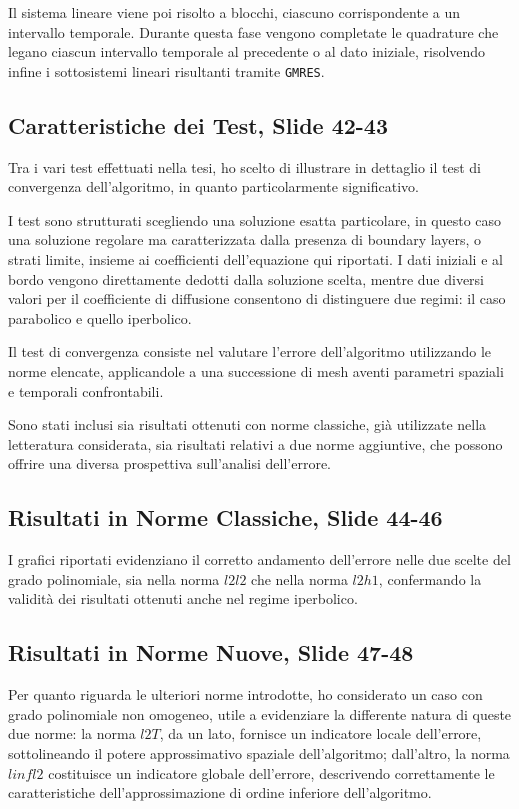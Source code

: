 \documentclass[12pt]{article}
\begin{document}
    Il sistema lineare viene poi risolto a blocchi, ciascuno corrispondente a un intervallo temporale. Durante questa fase vengono completate le quadrature che legano ciascun intervallo temporale al precedente o al dato iniziale, risolvendo infine i sottosistemi lineari risultanti tramite \lstinline{GMRES}.

    \subsection{Caratteristiche dei Test, Slide 42-43}

    Tra i vari test effettuati nella tesi, ho scelto di illustrare in dettaglio il test di convergenza dell'algoritmo, in quanto particolarmente significativo.

    I test sono strutturati scegliendo una soluzione esatta particolare, in questo caso una soluzione regolare ma caratterizzata dalla presenza di boundary layers, o strati limite, insieme ai coefficienti dell'equazione qui riportati. I dati iniziali e al bordo vengono direttamente dedotti dalla soluzione scelta, mentre due diversi valori per il coefficiente di diffusione consentono di distinguere due regimi: il caso parabolico e quello iperbolico.

    Il test di convergenza consiste nel valutare l'errore dell'algoritmo utilizzando le norme elencate, applicandole a una successione di mesh aventi parametri spaziali e temporali confrontabili.

    Sono stati inclusi sia risultati ottenuti con norme classiche, già utilizzate nella letteratura considerata, sia risultati relativi a due norme aggiuntive, che possono offrire una diversa prospettiva sull'analisi dell'errore.

    \subsection{Risultati in Norme Classiche, Slide 44-46}

    I grafici riportati evidenziano il corretto andamento dell'errore nelle due scelte del grado polinomiale, sia nella norma $l2l2$ che nella norma $l2h1$, confermando la validità dei risultati ottenuti anche nel regime iperbolico.

    \subsection{Risultati in Norme Nuove, Slide 47-48}

    Per quanto riguarda le ulteriori norme introdotte, ho considerato un caso con grado polinomiale non omogeneo, utile a evidenziare la differente natura di queste due norme: la norma $l2T$, da un lato, fornisce un indicatore locale dell'errore, sottolineando il potere approssimativo spaziale dell'algoritmo; dall'altro, la norma $linfl2$ costituisce un indicatore globale dell'errore, descrivendo correttamente le caratteristiche dell'approssimazione di ordine inferiore dell'algoritmo.
\end{document}

